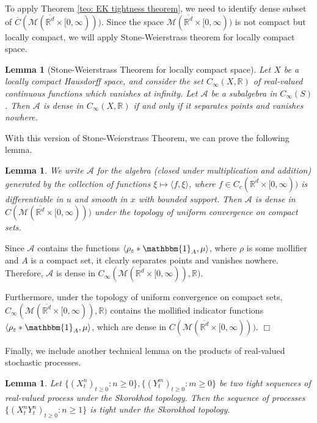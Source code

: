 \documentclass[12pt]{article}
\newenvironment {proof}{{\noindent\bf Proof }}{\hfill $\Box$ \medskip}
\newtheorem{lemma}[theorem]{Lemma}
\begin{document}
To apply Theorem \ref{teo: EK tightness theorem},
we need to identify dense subset of $\overline{C}(\mathcal{M}(\overline{\mathbb{R}^d} \times [0,\infty)))$.
Since the space $\mathcal{M}(\overline{\mathbb{R}^d} \times [0,\infty))$ is not compact but locally compact,
we will apply Stone-Weierstrass theorem for locally compact space.

\begin{lemma}[Stone-Weierstrass Theorem for locally compact space]
\label{lem: SW locally compact}
Let $X$ be a locally compact Hausdorff space, and consider the set  $C_{\infty}(X, \mathbb{R})$ of real-valued continuous functions which vanishes at infinity. 
Let $\mathcal{A}$ be a subalgebra in $C_{\infty}(S)$. Then $\mathcal{A}$ is dense in $C_{\infty}(X, \mathbb{R})$ if and only if it separates points and vanishes nowhere.
\end{lemma}

With this version of Stone-Weierstrass Theorem, we can prove the following lemma.
\begin{lemma}
\label{lem: uniform compact density}
We write $\mathcal{A}$ for the algebra (closed under multiplication and addition) generated by 
the collection of functions $\xi \mapsto \langle f, \xi \rangle$, where $ f \in C_c(\overline{\mathbb{R}^d} \times [0,\infty))$ is differentiable in $u$ and smooth in $x$ with bounded support.
Then $\mathcal{A}$ is dense in $C(\mathcal{M}(\overline{\mathbb{R}^d} \times [0,\infty)))$ under the topology of uniform convergence on compact sets.
\end{lemma}
\begin{proof}
Since $\mathcal{A}$ contains the functions $\langle \rho_{\varepsilon}*\mathbbm{1}_{A} , \mu \rangle$,
where $\rho$ is some mollifier and $A$ is a compact set, it clearly
separates points and vanishes nowhere.
Therefore, $\mathcal{A}$ is dense in $C_{\infty}(\mathcal{M}(\overline{\mathbb{R}^d} \times [0,\infty)), \mathbb{R})$.

Furthermore, under the topology of uniform convergence on compact sets, 
$C_{\infty}(\mathcal{M}(\overline{\mathbb{R}^d} \times [0,\infty)), \mathbb{R})$ 
contains the mollified indicator functions $\langle \rho_{\varepsilon}*\mathbbm{1}_{A} , \mu \rangle$,
which are dense in $C(\mathcal{M}(\overline{\mathbb{R}^d} \times [0,\infty)))$.
\end{proof}

Finally, we include another technical lemma on the products of real-valued stochastic processes. 
\begin{lemma}
\label{teo: product tightness}
Let $\{(X^n_t)_{t \geq 0}: n \geq 0\}, \{(Y^m_t)_{t \geq 0}: m \geq 0\}$ be two tight sequences of real-valued process under the Skorokhod topology.
Then the sequence of processes $\{(X^n_tY^n_t)_{t \geq 0}: n \geq 1\}$ is tight under the Skorokhod topology.
\end{lemma}
\end{document}
